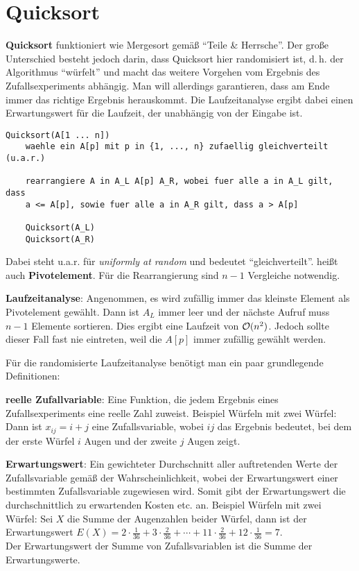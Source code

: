 \section{%
    Quicksort%
}

\textbf{Quicksort} funktioniert wie Mergesort gemäß "`Teile \& Herrsche"'.
Der große Unterschied besteht jedoch darin, dass Quicksort hier randomisiert
ist, d.\,h. der Algorithmus "`würfelt"' und macht das weitere Vorgehen
vom Ergebnis des Zufallsexperiments abhängig.
Man will allerdings garantieren, dass am Ende immer das richtige Ergebnis
herauskommt.
Die Laufzeitanalyse ergibt dabei einen Erwartungswert für die Laufzeit,
der unabhängig von der Eingabe ist.

\begin{lstlisting}
Quicksort(A[1 ... n])
    waehle ein A[p] mit p in {1, ..., n} zufaellig gleichverteilt (u.a.r.)

    rearrangiere A in A_L A[p] A_R, wobei fuer alle a in A_L gilt, dass
    a <= A[p], sowie fuer alle a in A_R gilt, dass a > A[p]

    Quicksort(A_L)
    Quicksort(A_R)
\end{lstlisting}

Dabei steht u.a.r. für \emph{uniformly at random} und bedeutet
"`gleichverteilt"'.
 heißt auch \textbf{Pivotelement}.
Für die Rearrangierung sind $n - 1$ Vergleiche notwendig.

\linie

\textbf{Laufzeitanalyse}:
Angenommen, es wird zufällig immer das kleinste Element als Pivotelement
gewählt.
Dann ist $A_L$ immer leer und der nächste Aufruf muss $n - 1$ Elemente
sortieren.
Dies ergibt eine Laufzeit von $\mathcal{O}(n^2)$.
Jedoch sollte dieser Fall fast nie eintreten, weil die $A[p]$ immer zufällig
gewählt werden.

Für die randomisierte Laufzeitanalyse benötigt man ein paar grundlegende
Definitionen:

\textbf{reelle Zufallvariable}: Eine Funktion, die jedem Ergebnis eines
Zufallsexperiments eine reelle Zahl zuweist.
Beispiel Würfeln mit zwei Würfel:
Dann ist $x_{ij} = i + j$ eine Zufallsvariable, wobei $ij$ das Ergebnis
bedeutet, bei dem der erste Würfel $i$ Augen und der zweite $j$ Augen zeigt.

\textbf{Erwartungswert}: Ein gewichteter Durchschnitt aller auftretenden
Werte der Zufallsvariable gemäß der Wahrscheinlichkeit, wobei der
Erwartungswert einer bestimmten Zufallsvariable zugewiesen wird.
Somit gibt der Erwartungswert die durchschnittlich zu erwartenden Kosten
etc. an.
Beispiel Würfeln mit zwei Würfel:
Sei $X$ die Summe der Augenzahlen beider Würfel, dann ist
der Erwartungswert $E(X) = 2 \cdot \frac{1}{36} + 3 \cdot \frac{2}{36} +
\dotsb + 11 \cdot \frac{2}{36} + 12 \cdot \frac{1}{36} = 7$. \\
Der Erwartungswert der Summe von Zufallsvariablen ist die Summe
der Erwartungswerte.

